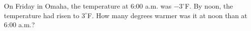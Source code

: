 On Friday in Omaha, the temperature at 6:00 a.m. was $-3^\circ$F. By noon, the temperature had risen to $3^\circ$F. How many degrees warmer was it at noon than at 6:00 a.m.?
